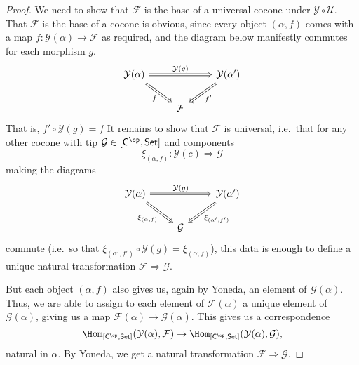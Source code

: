 \documentclass[main.tex]{subfiles}
\begin{document}
\begin{proof}
  We need to show that $\mathcal{F}$ is the base of a universal cocone under $\mathcal{Y} \circ \mathcal{U}$. That $\mathcal{F}$ is the base of a cocone is obvious, since every object $(\alpha, f)$ comes with a map $f\colon \mathcal{Y}(\alpha) \to \mathcal{F}$ as required, and the diagram below manifestly commutes for each morphism $g$.
  \begin{equation*}
    \begin{tikzcd}
      \mathcal{Y}(\alpha)
      \arrow[rd, swap, Rightarrow, "f"]
      \arrow[rr, Rightarrow, "\mathcal{Y}(g)"]
      && \mathcal{Y}(\alpha')
      \arrow[ld, Rightarrow, "f'"]
      \\
      & \mathcal{F}
    \end{tikzcd}
  \end{equation*}
  That is, $f' \circ \mathcal{Y}(g) = f$
  It remains to show that $\mathcal{F}$ is universal, i.e.\ that for any other cocone with tip $\mathcal{G} \in [\mathsf{C}^{\op}, \mathsf{Set}]$ and components
  \begin{equation*}
    \xi_{(\alpha, f)}\colon \mathcal{Y}(c) \Rightarrow \mathcal{G}
  \end{equation*}
  making the diagrams
  \begin{equation*}
    \begin{tikzcd}
      \mathcal{Y}(\alpha)
      \arrow[rd, swap, Rightarrow, "\xi_{(\alpha, f)}"]
      \arrow[rr, Rightarrow, "\mathcal{Y}(g)"]
      && \mathcal{Y}(\alpha')
      \arrow[ld, Rightarrow, "\xi_{(\alpha', f')}"]
      \\
      & \mathcal{G}
    \end{tikzcd}
  \end{equation*}
  commute (i.e.\ so that $\xi_{(\alpha', f')} \circ \mathcal{Y}(g) = \xi_{(\alpha, f)}$), this data is enough to define a unique natural transformation $\mathcal{F} \Rightarrow \mathcal{G}$.

  But each object $(\alpha, f)$ also gives us, again by Yoneda, an element of $\mathcal{G}(\alpha)$. Thus, we are able to assign to each element of $\mathcal{F}(\alpha)$ a unique element of $\mathcal{G}(\alpha)$, giving us a map $\mathcal{F}(\alpha) \to \mathcal{G}(\alpha)$. This gives us a correspondence
  \begin{equation*}
    \Hom_{[\mathsf{C}^{\op}, \mathsf{Set}]}(\mathcal{Y}(\alpha), \mathcal{F}) \to \Hom_{[\mathsf{C}^{\op}, \mathsf{Set}]}(\mathcal{Y}(\alpha), \mathcal{G}),
  \end{equation*}
  natural in $\alpha$. By Yoneda, we get a natural transformation $\mathcal{F} \Rightarrow \mathcal{G}$.
\end{proof}
\end{document}
